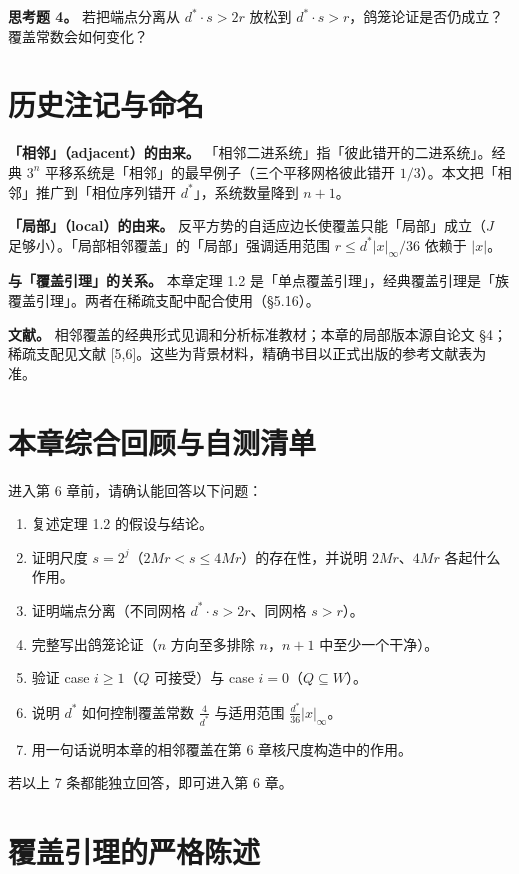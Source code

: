 \documentclass[a4paper,11pt,openany]{ctexbook}
\numberwithin{equation}{chapter}
\numberwithin{figure}{chapter}
\numberwithin{table}{chapter}
\begin{document}
\textbf{思考题 4。} 若把端点分离从 $d^*\cdot s>2r$ 放松到 $d^*\cdot s>r$，鸽笼论证是否仍成立？覆盖常数会如何变化？

\section{历史注记与命名}

\textbf{「相邻」（adjacent）的由来。} 「相邻二进系统」指「彼此错开的二进系统」。经典 $3^n$ 平移系统是「相邻」的最早例子（三个平移网格彼此错开 $1/3$）。本文把「相邻」推广到「相位序列错开 $d^*$」，系统数量降到 $n+1$。

\textbf{「局部」（local）的由来。} 反平方势的自适应边长使覆盖只能「局部」成立（$J$ 足够小）。「局部相邻覆盖」的「局部」强调适用范围 $r\le d^*|x|_\infty/36$ 依赖于 $|x|$。

\textbf{与「覆盖引理」的关系。} 本章定理 1.2 是「单点覆盖引理」，经典覆盖引理是「族覆盖引理」。两者在稀疏支配中配合使用（§5.16）。

\textbf{文献。} 相邻覆盖的经典形式见调和分析标准教材；本章的局部版本源自论文 §4；稀疏支配见文献 [5,6]。这些为背景材料，精确书目以正式出版的参考文献表为准。

\section{本章综合回顾与自测清单}

进入第 6 章前，请确认能回答以下问题：

\begin{enumerate}
\item 复述定理 1.2 的假设与结论。
\item 证明尺度 $s=2^j$（$2Mr<s\le4Mr$）的存在性，并说明 $2Mr$、$4Mr$ 各起什么作用。
\item 证明端点分离（不同网格 $d^*\cdot s>2r$、同网格 $s>r$）。
\item 完整写出鸽笼论证（$n$ 方向至多排除 $n$，$n+1$ 中至少一个干净）。
\item 验证 case $i\ge1$（$Q$ 可接受）与 case $i=0$（$Q\subseteq W$）。
\item 说明 $d^*$ 如何控制覆盖常数 $\frac4{d^*}$ 与适用范围 $\frac{d^*}{36}|x|_\infty$。
\item 用一句话说明本章的相邻覆盖在第 6 章核尺度构造中的作用。
\end{enumerate}

若以上 7 条都能独立回答，即可进入第 6 章。

\section{覆盖引理的严格陈述}
\end{document}

